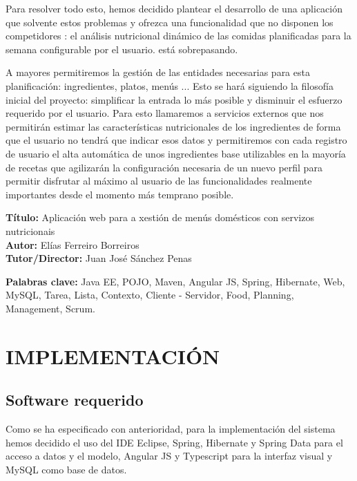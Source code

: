 \documentclass[12pt, a4paper, twoside]{book}
\begin{document}
	Para resolver todo esto, hemos decidido plantear el desarrollo de una aplicación que solvente estos problemas y ofrezca una funcionalidad que no disponen los competidores : el análisis nutricional dinámico de las comidas planificadas para la semana configurable por el usuario. está sobrepasando.
	
	A mayores permitiremos la gestión de las entidades necesarias para esta planificación: ingredientes, platos, menús ... 
	Esto se hará siguiendo la filosofía inicial del proyecto: simplificar la entrada lo más posible y disminuir el esfuerzo requerido por el usuario. 
	Para esto llamaremos a servicios externos que nos permitirán estimar las características nutricionales de los ingredientes de forma que el usuario no tendrá que indicar esos datos y permitiremos con cada registro de usuario el alta automática de unos ingredientes base utilizables en la mayoría de recetas que agilizarán la configuración necesaria de un nuevo perfil para permitir disfrutar al máximo al usuario de las funcionalidades realmente importantes desde el momento más temprano posible.
	
	\clearpage
	
	\textbf{Título:} Aplicación web para a xestión de menús domésticos con servizos nutricionais
	\\
	\textbf{Autor:} Elías Ferreiro Borreiros
	\\
	\textbf{Tutor/Director:} Juan José Sánchez Penas
	
	
	\textbf{Palabras clave:} Java EE, POJO, Maven, Angular JS, Spring, Hibernate, Web, MySQL, Tarea, Lista, Contexto, Cliente - Servidor, Food, Planning, Management, Scrum. 
	
	
	\renewcommand{\contentsname}{Índice de contenidos}
	\renewcommand{\listfigurename}{Índice de figuras}
	\renewcommand{\listtablename}{Índice de tablas}
	
	\tableofcontents %
	
	\listoffigures %
	
	\listoftables %
	
	\clearpage
	
	\chapter{IMPLEMENTACIÓN}
	\section{Software requerido}
	Como se ha especificado con anterioridad, para la implementación del sistema hemos decidido el uso del IDE Eclipse, Spring, Hibernate y Spring Data para el acceso a datos y el modelo, Angular JS y Typescript para la interfaz visual y MySQL como base de datos.
\end{document}
